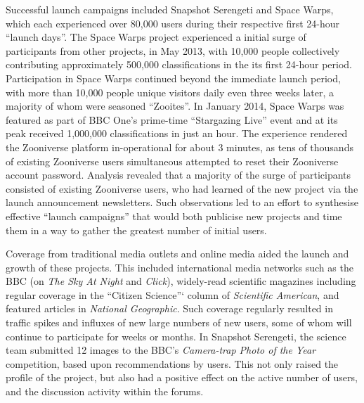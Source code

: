 \documentclass{sigchi}
\begin{document}
\begin{spacing}{0.97}
Successful launch campaigns included Snapshot Serengeti and Space Warps, which each experienced over 80,000 users during their respective first 24-hour ``launch days''. The Space Warps project experienced a initial surge of participants from other projects, in May 2013, with 10,000 people collectively contributing approximately 500,000 classifications in the its first 24-hour period. Participation in Space Warps continued beyond the immediate launch period, with more than 10,000 people unique visitors daily even three weeks later, a majority of whom were seasoned ``Zooites''. In January 2014, Space Warps was featured as part of BBC One's prime-time ``Stargazing Live'' event and at its peak received 1,000,000 classifications in just an hour. The experience rendered the Zooniverse platform in-operational for about 3 minutes, as tens of thousands of existing Zooniverse users simultaneous attempted to reset their Zooniverse account password. Analysis revealed that a majority of the surge of participants consisted of existing Zooniverse users, who had learned of the new project via the launch announcement newsletters. Such observations led to an effort to synthesise effective ``launch campaigns'' that would both publicise new projects and time them in a way to gather the greatest number of initial users. 



Coverage from traditional media outlets and online media aided the launch and growth of these projects. This included international media networks such as the BBC (on \emph{The Sky At Night} and \emph{Click}), widely-read scientific magazines including regular coverage in the ``Citizen Science''` column of \emph{Scientific American}, and featured articles in \emph{National Geographic}. Such coverage regularly resulted in traffic spikes and influxes of new large numbers of new users, some of whom will continue to participate for weeks or months. In Snapshot Serengeti, the science team submitted 12 images to the BBC's \emph{Camera-trap Photo of the Year} competition, based upon recommendations by users. This not only raised the profile of the project, but also had a positive effect on the active number of users, and the discussion activity within the forums. 


\end{spacing}
\end{document}
